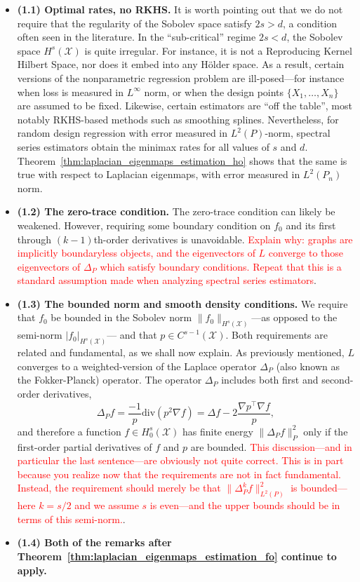 \documentclass{article}
\newcommand{\1}{\mathbf{1}}
\newcommand{\Leb}{L}
\newcommand{\mc}[1]{\mathcal{#1}}
\theoremstyle{alden}
\theoremstyle{aldenthm}
\theoremstyle{definition}
\theoremstyle{remark}
\begin{document}
\begin{itemize}
	\item \textbf{(1.1) Optimal rates, no RKHS.} It is worth pointing out that we do not require that the regularity of the Sobolev space satisfy $2s > d$, a condition often seen in the literature. In the ``sub-critical'' regime $2s < d$, the Sobolev space $H^s(\mc{X})$ is quite irregular. For instance, it is not a Reproducing Kernel Hilbert Space, nor does it embed into any H\"{o}lder space. As a result, certain versions of the nonparametric regression problem are ill-posed---for instance when loss is measured in $\Leb^{\infty}$ norm, or when the design points $\{X_1,\ldots,X_n\}$ are assumed to be fixed. Likewise, certain estimators are ``off the table'', most notably RKHS-based methods such as smoothing splines. Nevertheless, for random design regression with error measured in $\Leb^2(P)$-norm, spectral series estimators obtain the minimax rates for all values of $s$ and $d$. Theorem~\ref{thm:laplacian_eigenmaps_estimation_ho} shows that the same is true with respect to Laplacian eigenmaps, with error measured in $\Leb^2(P_n)$ norm.
	\item \textbf{(1.2) The zero-trace condition.} The zero-trace condition can likely be weakened. However, requiring some boundary condition on $f_0$ and its first through $(k -1 )$th-order derivatives is unavoidable. \textcolor{red}{Explain why: graphs are implicitly boundaryless objects, and the eigenvectors of $L$ converge to those eigenvectors of $\Delta_P$ which satisfy boundary conditions. Repeat that this is a standard assumption made when analyzing spectral series estimators}.
	\item \textbf{(1.3) The bounded norm and smooth density conditions.} We require that $f_0$ be bounded in the Sobolev norm $\|f_0\|_{H^s(\mc{X})}$---as opposed to the semi-norm $|f_0|_{H^s(\mc{X})}$--- and that $p \in C^{s - 1}(\mc{X})$. Both requirements are related and fundamental, as we shall now explain. As previously mentioned, $L$ converges to a weighted-version of the Laplace operator $\Delta_P$ (also known as the Fokker-Planck) operator. The operator $\Delta_P$ includes both first and second-order derivatives,
	\begin{equation}
	\label{eqn:fokker_planck_1}
	\Delta_Pf= \frac{-1}{p} \mathrm{div}(p^2 \nabla f) = \Delta f - 2\frac{\nabla p^{\top} \nabla f}{p},
	\end{equation}
	and therefore a function $f \in H_0^s(\mc{X})$ has finite energy $\|\Delta_P f\|_{P}^2$ only if the first-order partial derivatives of $f$ and $p$ are bounded. \textcolor{red}{This discussion---and in particular the last sentence---are obviously not quite correct. This is in part because you realize now that the requirements are not in fact fundamental. Instead, the requirement should merely be that $\|\Delta_P^kf\|_{\Leb^2(P)}^2$ is bounded---here $k = s/2$ and we assume $s$ is even---and the upper bounds should be in terms of this semi-norm.}.
	\item \textbf{(1.4) Both of the remarks after Theorem~\ref{thm:laplacian_eigenmaps_estimation_fo} continue to apply.}
\end{itemize}
\end{document}
